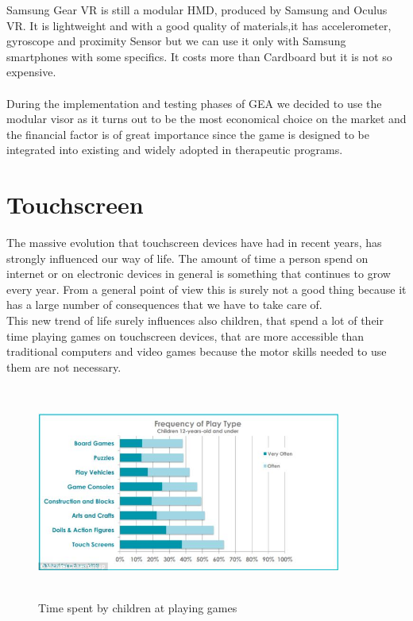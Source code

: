 Samsung Gear VR is still a modular HMD, produced by Samsung and Oculus VR. It is lightweight and with a good quality of materials,it has accelerometer, gyroscope and proximity Sensor but we can use it only with Samsung smartphones with some specifics. It costs more than Cardboard but it is not so expensive.\\
\\
During the implementation and testing phases of GEA we decided to use the modular visor as it turns out to be the most economical choice on the market and the financial factor is of great importance since the game is designed to be integrated into existing and widely adopted in therapeutic programs.

\section{Touchscreen}
The massive evolution that touchscreen devices have had in recent years, has strongly influenced our way of life. The amount of time a person spend on internet or on electronic devices in general is something that continues to grow every year. From a general point of view this is surely not a good thing because it has a large number of consequences that we have to take care of. \\
This new trend of life surely influences also children, that spend a lot of their time playing games on touchscreen devices, that are more accessible than traditional computers and video games because the motor skills needed to use them are not necessary.\\
\begin{figure}[H]
\centering
\includegraphics[width=10cm, height=7cm]{immagini/touch.png}
\caption{Time spent by children at playing games}\label{fig:timegames}
\end{figure}
